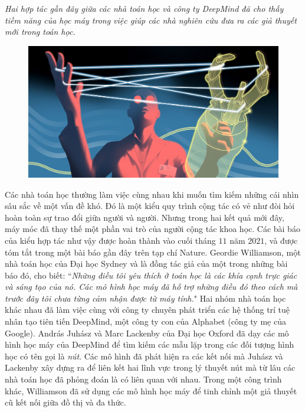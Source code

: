 \vspace*{200pt}

\begin{multicols}{2}	
	\textit{Hai hợp tác gần đây giữa các nhà toán học và công ty DeepMind đã cho thấy tiềm năng của học máy trong việc giúp các nhà nghiên cứu đưa ra các giả thuyết mới trong toán học.}
	\begin{figure}[H]
		\centering
		\vspace*{-5pt}
		\captionsetup{labelformat= empty, justification=centering}
		\includegraphics[width=1\linewidth]{1}
		\vspace*{-15pt}
	\end{figure}
	Các nhà toán học thường làm việc cùng nhau khi muốn tìm kiếm những cái nhìn sâu sắc về một vấn đề khó. Đó là một kiểu quy trình cộng tác có vẻ như đòi hỏi hoàn toàn sự trao đổi giữa người và người.
	\vskip 0.05cm
	Nhưng trong hai kết quả mới đây, máy móc đã thay thế một phần vai trò của người cộng tác khoa học. Các bài báo của kiểu hợp tác như vậy được hoàn thành vào cuối tháng $11$ năm $2021$, và được tóm tắt trong một bài báo gần đây trên tạp chí Nature.
	\vskip 0.05cm
	Geordie Williamson, một nhà toán học của Đại học Sydney và là đồng tác giả của một trong những bài báo đó, cho biết: ``\textit{Những điều tôi yêu thích ở toán học là các khía cạnh trực giác và sáng tạo của nó. Các mô hình học máy đã hỗ trợ những điều đó theo cách mà trước đây tôi chưa từng cảm nhận được từ máy tính.}"
	\vskip 0.05cm
	Hai nhóm nhà toán học khác nhau đã làm việc cùng với công ty chuyên phát triển các hệ thống trí tuệ nhân tạo tiên tiến DeepMind, một công ty con của Alphabet (công ty mẹ của Google).
	\vskip 0.05cm
	András Juhász và Marc Lackenby của Đại học Oxford đã dạy các mô hình học máy của DeepMind để tìm kiếm các mẫu lặp trong các đối tượng hình học có tên gọi là \textit{nút}. Các mô hình đã phát hiện ra các kết nối mà Juhász và Lackenby xây dựng ra để liên kết hai lĩnh vực trong lý thuyết nút mà từ lâu các nhà toán học đã phỏng đoán là có liên quan với nhau. Trong một công trình khác, Williamson đã sử dụng các mô hình học máy để tinh chỉnh một giả thuyết cũ kết nối giữa đồ thị và đa thức.

\end{multicols}
